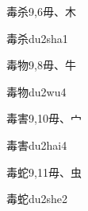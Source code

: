 \begin{entry}{毒杀}{9,6}{⽏、⽊}
  \begin{phonetics}{毒杀}{du2sha1}
  \end{phonetics}
\end{entry}

\begin{entry}{毒物}{9,8}{⽏、⽜}
  \begin{phonetics}{毒物}{du2wu4}
  \end{phonetics}
\end{entry}

\begin{entry}{毒害}{9,10}{⽏、⼧}
  \begin{phonetics}{毒害}{du2hai4}
  \end{phonetics}
\end{entry}

\begin{entry}{毒蛇}{9,11}{⽏、⾍}
  \begin{phonetics}{毒蛇}{du2she2}
  \end{phonetics}
\end{entry}


